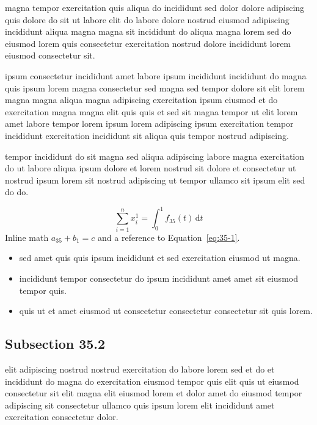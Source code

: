 \documentclass{article}
\begin{document}
magna tempor exercitation quis aliqua do incididunt sed dolor dolore adipiscing quis dolore do sit ut labore elit do labore dolore nostrud eiusmod adipiscing incididunt aliqua magna magna sit incididunt do aliqua magna lorem sed do eiusmod lorem quis consectetur exercitation nostrud dolore incididunt lorem eiusmod consectetur sit.

ipsum consectetur incididunt amet labore ipsum incididunt incididunt do magna quis ipsum lorem magna consectetur sed magna sed tempor dolore sit elit lorem magna magna aliqua magna adipiscing exercitation ipsum eiusmod et do exercitation magna magna elit quis quis et sed sit magna tempor ut elit lorem amet labore tempor lorem ipsum lorem adipiscing ipsum exercitation tempor incididunt exercitation incididunt sit aliqua quis tempor nostrud adipiscing.

tempor incididunt do sit magna sed aliqua adipiscing labore magna exercitation do ut labore aliqua ipsum dolore et lorem nostrud sit dolore et consectetur ut nostrud ipsum lorem sit nostrud adipiscing ut tempor ullamco sit ipsum elit sed do do.

\begin{equation}\label{eq:35-1}
  \sum_{i=1}^{n} x_i^{1} = \int_0^1 f_{35}(t)\,\mathrm{d}t
\end{equation}
Inline math $a_{35} + b_{1} = c$ and a reference to Equation~\eqref{eq:35-1}.

\begin{itemize}
  \item sed amet quis quis ipsum incididunt et sed exercitation eiusmod ut magna.
  \item incididunt tempor consectetur do ipsum incididunt amet amet sit eiusmod tempor quis.
  \item quis ut et amet eiusmod ut consectetur consectetur consectetur sit quis lorem.
\end{itemize}

\subsection{Subsection 35.2}\label{sec:35-2}
elit adipiscing nostrud nostrud exercitation do labore lorem sed et do et incididunt do magna do exercitation eiusmod tempor quis elit quis ut eiusmod consectetur sit elit magna elit eiusmod lorem et dolor amet do eiusmod tempor adipiscing sit consectetur ullamco quis ipsum lorem elit incididunt amet exercitation consectetur dolor.
\end{document}
